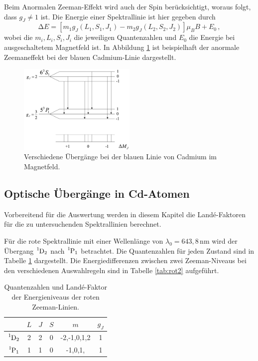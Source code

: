 Beim Anormalen Zeeman-Effekt wird auch der Spin berücksichtigt, woraus folgt, dass
$g_J\neq1$ ist. Die Energie einer Spektrallinie ist hier gegeben durch
\begin{equation}
  \increment E = [m_1 g_J(L_1,S_1,J_1) - m_2 g_J(L_2,S_2,J_2)] \mu_B B +E_0\,,
\end{equation}
wobei die $m_i, L_i, S_i, J_i$ die jeweiligen Quantenzahlen und $E_0$ die Energie bei
ausgeschaltetem Magnetfeld ist. In Abbildung \ref{fig:cdblau} ist beispielhaft der
anormale Zeemaneffekt bei der blauen Cadmium-Linie dargestellt.

\begin{figure}
  \centering
  \includegraphics[width=0.5\textwidth]{data/cd_blau.png}
  \caption{Verschiedene Übergänge bei der blauen Linie von Cadmium im Magnetfeld. \cite{cdblau}}
  \label{fig:cdblau}
\end{figure}


\subsection{Optische Übergänge in Cd-Atomen}

Vorbereitend für die Auswertung werden in diesem Kapitel die Landé-Faktoren für die
zu untersuchenden Spektrallinien berechnet.

Für die rote Spektrallinie mit einer Wellenlänge von $\lambda_0=643{,}8\,$nm wird
der Übergang $\ce{^{1}D_2}$ nach $\ce{^{1}P_1}$ betrachtet. Die Quantenzahlen für
jeden Zustand sind in Tabelle \ref{tab:rot1} dargestellt. Die Energiedifferenzen zwischen
zwei Zeeman-Niveaus bei den verschiedenen Auswahlregeln sind in Tabelle \ref{tab:rot2}
aufgeführt.

\begin{table}
  \centering
  \caption{Quantenzahlen und Landé-Faktor der Energieniveaus der roten Zeeman-Linien.}
  \begin{tabular}{c c c c c c}
    \toprule
    & $L$ & $J$ & $S$ & $m$ & $g_J$ \\
    \midrule
    $\ce{^{1}D_2}$ & 2 & 2 & 0 & -2,-1,0,1,2 & 1 \\
    $\ce{^{1}P_1}$ & 1 & 1 & 0 & -1,0,1, & 1 \\
    \bottomrule
\end{tabular}
  \label{tab:rot1}
\end{table}

